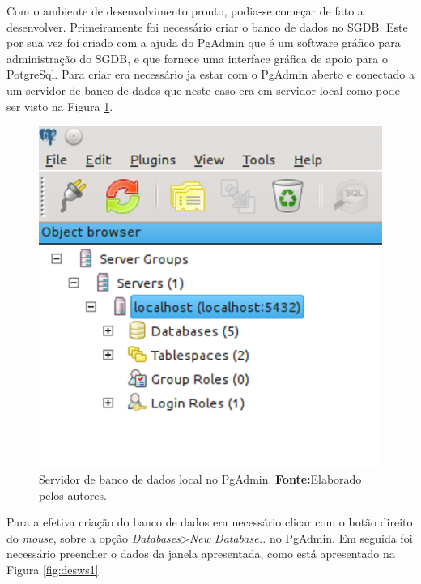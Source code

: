 
	
	\par Com o ambiente de desenvolvimento pronto, podia-se começar de fato a
desenvolver. Primeiramente foi necessário criar o banco de dados no SGDB. Este
por sua vez foi criado com a ajuda do PgAdmin que é um software gráfico para
administração do SGDB, e que fornece uma interface gráfica de apoio para o
PotgreSql. Para criar era necessário ja estar com o PgAdmin aberto e conectado a
um servidor de banco de dados que neste caso era em servidor local como pode ser
visto na Figura \ref{fig:desws}.

	\begin{figure}[h!]
		\centerline{\includegraphics[scale=1]{./imagens/2_q_metodologico/4_procedimentos_resultados/43_webservice/432_desenvolvimento/desws.png}}
		\caption[Servidor de banco de dados local no PgAdmin]{Servidor de banco de
		dados local no PgAdmin.
			\textbf{Fonte:}Elaborado pelos autores.}
		\label{fig:desws}
	\end{figure}
	
	\par Para a efetiva criação do banco de dados era necessário clicar com o botão
direito do \textit{mouse}, sobre a opção \textit{Databases}>\textit{New
Database..} no PgAdmin. Em seguida foi necessário preencher o dados da janela
apresentada, como está apresentado na Figura \ref{fig:desws1}.

